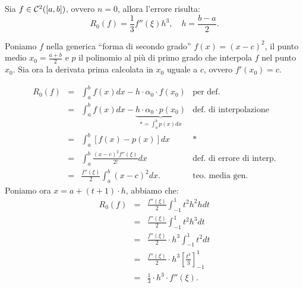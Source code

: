 \begin{prop}
Sia $f \in \mathcal{C}^{2}([a,b])$, ovvero $n = 0$, allora l'errore risulta:
\[
R_0(f) = \frac{1}{3}f''(\xi)h^3, \quad h = \frac{b-a}{2}.
\]
\end{prop}
\begin{dimo}
Poniamo $f$ nella generica ``forma di secondo grado'' $f(x) = (x-c)^2$, il
punto medio $x_0=\frac{a+b}{2}$ e $p$ il polinomio al più di primo
grado che interpola $f$ nel punto $x_0$. Sia ora la derivata prima
calcolata in $x_0$ uguale a $c$, ovvero $f'\left(x_0\right) = c$.

\[\begin{array}{lclr}
R_0(f) &=& \displaystyle \int_a^bf(x)dx - h\cdot \alpha_0 
\cdot f\left(x_0\right) & \textrm{per def.} \\
&=& \displaystyle\int_a^bf(x)dx - \underbrace{h\cdot \alpha_0\cdot
 p\left(x_0\right)}_{* = \int_a^bp(x)dx}& \textrm{def. di interpolazione}\\
&=& \displaystyle\int_a^b\left[f(x)-p(x)\right]dx & *\\
&=& \displaystyle\int_a^b\frac{(x-c)^2f''(\xi)}{2!}dx 
& \textrm{def. di errore di interp.}\\
&=& \displaystyle\frac{f''(\xi)}{2}\int_a^b(x-c)^2dx. & \textrm{teo. media gen.}
\end{array}\]
Poniamo ora $x = a + (t+1)\cdot h$, abbiamo che:
\[\begin{array}{lcl}
R_0(f) &=& \displaystyle\frac{f''(\xi)}{2}\int_{-1}^1t^2h^2hdt \\
&=& \displaystyle\frac{f''(\xi)}{2}\int_{-1}^1t^2h^3dt\\
&=& \displaystyle\frac{f''(\xi)}{2}\cdot h^3 \int_{-1}^1t^2dt \\
&=& \displaystyle\frac{f''(\xi)}{2}\cdot h^3 \left[\frac{t^3}{3}\right]_{-1}^1\\
&=& \displaystyle\frac{1}{3}\cdot h^3 \cdot f''(\xi).
\end{array}
\]
\end{dimo}
